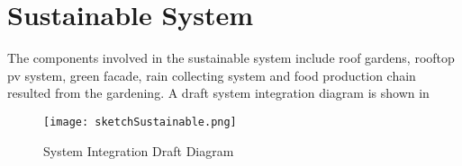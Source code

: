 \section{Sustainable System}
The components involved in the sustainable system include roof gardens, rooftop pv system, green facade, rain collecting system and food production chain resulted from the gardening. A draft system integration diagram is shown in 
\begin{figure}[htbp]
	\centering
		\texttt{[image: sketchSustainable.png]}
	\caption[System Integration Draft Diagram]{System Integration Draft Diagram}
	\label{fig:sketchSustainable}
\end{figure}